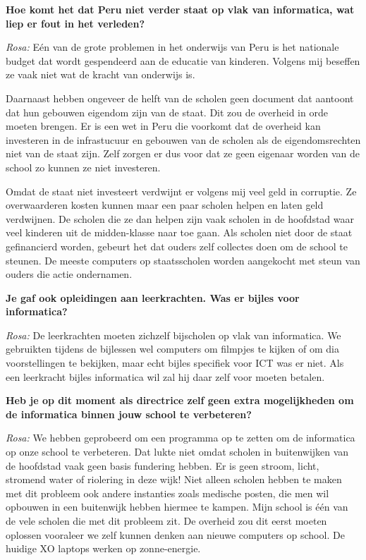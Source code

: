 \textbf{Hoe komt het dat Peru niet verder staat op vlak van informatica, wat liep er fout in het verleden?}

\textit{Rosa:} Eén van de grote problemen in het onderwijs van Peru is het nationale budget dat wordt gespendeerd aan de educatie van kinderen. Volgens mij beseffen ze vaak niet wat de kracht van onderwijs is. 

Daarnaast hebben ongeveer de helft van de scholen geen document dat aantoont dat hun gebouwen eigendom zijn van de staat. Dit zou de overheid in orde moeten brengen. Er is een wet in Peru die voorkomt dat de overheid kan investeren in de infrastucuur en gebouwen van de scholen als de eigendomsrechten niet van de staat zijn. Zelf zorgen er dus voor dat ze geen eigenaar worden van de school zo kunnen ze niet investeren.

Omdat de staat niet investeert verdwijnt er volgens mij veel geld in corruptie. Ze overwaarderen kosten kunnen maar een paar scholen helpen en laten geld verdwijnen. De scholen die ze dan helpen zijn vaak scholen in de hoofdstad waar veel kinderen uit de midden-klasse naar toe gaan. Als scholen niet door de staat gefinancierd worden, gebeurt het dat ouders zelf collectes doen om de school te steunen. De meeste computers op staatsscholen worden aangekocht met steun van ouders die actie ondernamen. 

\textbf{Je gaf ook opleidingen aan leerkrachten. Was er bijles voor informatica?}

\textit{Rosa:} De leerkrachten moeten zichzelf bijscholen op vlak van informatica. We gebruikten tijdens de bijlessen wel computers om filmpjes te kijken of om dia voorstellingen te bekijken, maar echt bijles specifiek voor ICT was er niet. Als een leerkracht bijles informatica wil zal hij daar zelf voor moeten betalen.

\textbf{Heb je op dit moment als directrice zelf geen extra mogelijkheden om de informatica binnen jouw school te verbeteren?}

\textit{Rosa:} We hebben geprobeerd om een programma op te zetten om de informatica op onze school te verbeteren. Dat lukte niet omdat scholen in buitenwijken van de hoofdstad vaak geen basis fundering hebben. Er is geen stroom, licht, stromend water of riolering in deze wijk! Niet alleen scholen hebben te maken met dit probleem ook andere instanties zoals medische posten, die men wil opbouwen in een buitenwijk hebben hiermee te kampen. Mijn school is één van de vele scholen die met dit probleem zit. De overheid zou dit eerst moeten oplossen vooraleer we zelf kunnen denken aan nieuwe computers op school. De huidige XO laptops werken op zonne-energie. 


